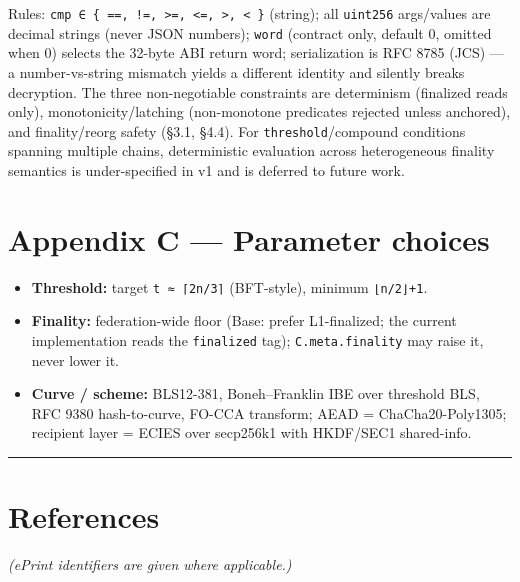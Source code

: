 \documentclass[
  11pt,
]{article}
\providecommand{\tightlist}{%
  \setlength{\itemsep}{0pt}\setlength{\parskip}{0pt}}
\begin{document}
Rules:
\texttt{cmp\ ∈\ \{\ ==,\ !=,\ \textgreater{}=,\ \textless{}=,\ \textgreater{},\ \textless{}\ \}}
(string); all \texttt{uint256} args/values are decimal strings (never
JSON numbers); \texttt{word} (contract only, default 0, omitted when 0)
selects the 32-byte ABI return word; serialization is RFC 8785 (JCS) ---
a number-vs-string mismatch yields a different identity and silently
breaks decryption. The three non-negotiable constraints are determinism
(finalized reads only), monotonicity/latching (non-monotone predicates
rejected unless anchored), and finality/reorg safety (§3.1, §4.4). For
\texttt{threshold}/compound conditions spanning multiple chains,
deterministic evaluation across heterogeneous finality semantics is
under-specified in v1 and is deferred to future work.

\section{Appendix C --- Parameter
choices}\label{appendix-c-parameter-choices}

\begin{itemize}
\tightlist
\item
  \textbf{Threshold:} target \texttt{t\ ≈\ ⌈2n/3⌉} (BFT-style), minimum
  \texttt{⌊n/2⌋+1}.
\item
  \textbf{Finality:} federation-wide floor (Base: prefer L1-finalized;
  the current implementation reads the \texttt{finalized} tag);
  \texttt{C.meta.finality} may raise it, never lower it.
\item
  \textbf{Curve / scheme:} BLS12-381, Boneh--Franklin IBE over threshold
  BLS, RFC 9380 hash-to-curve, FO-CCA transform; AEAD =
  ChaCha20-Poly1305; recipient layer = ECIES over secp256k1 with
  HKDF/SEC1 shared-info.
\end{itemize}

\begin{center}\rule{0.5\linewidth}{0.5pt}\end{center}

\section{References}\label{references}

\emph{(ePrint identifiers are given where applicable.)}
\end{document}
